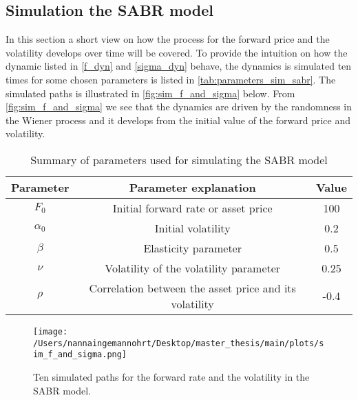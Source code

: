 \subsection{Simulation the SABR model}
In this section a short view on how the process for the forward price and the volatility develops over time will be covered. 
To provide the intuition on how the dynamic listed in \autoref{f_dyn} and \autoref{sigma_dyn} behave, the dynamics is simulated ten times
for some chosen parameters is listed in \autoref{tab:parameters_sim_sabr}. 
The simulated paths is illustrated in \autoref{fig:sim_f_and_sigma} below. 
From \autoref{fig:sim_f_and_sigma} we see that the dynamics are driven by the randomness in the Wiener process and 
it develops from the initial value of the forward price and volatility.
\\
\begin{table}[H]
    \centering
    \begin{tabular}{ccc}
      \toprule
      \textbf{Parameter} & \textbf{Parameter explanation} & \textbf{Value} \\
      \midrule
      \rowcolor{lightgray!40}  $F_0$ & Initial forward rate or asset price & 100 \\
      $\alpha_0$ & Initial volatility  & 0.2 \\
      \rowcolor{lightgray!40}  $\beta$ & Elasticity parameter & 0.5 \\
      $\nu$ & Volatility of the volatility parameter & 0.25 \\
      \rowcolor{lightgray!40} $\rho$ & Correlation between the asset price and its volatility & -0.4 \\
      \bottomrule
    \end{tabular}
    \caption{Summary of parameters used for simulating the SABR model}
    \label{tab:parameters_sim_sabr}
\end{table}
\noindent

\begin{figure}[H]
    \centering
    \texttt{[image: /Users/nannaingemannohrt/Desktop/master\_thesis/main/plots/sim\_f\_and\_sigma.png]}
    \caption{Ten simulated paths for the forward rate and the volatility in the SABR model.}
    \label{fig:sim_f_and_sigma}
\end{figure}
\noindent
